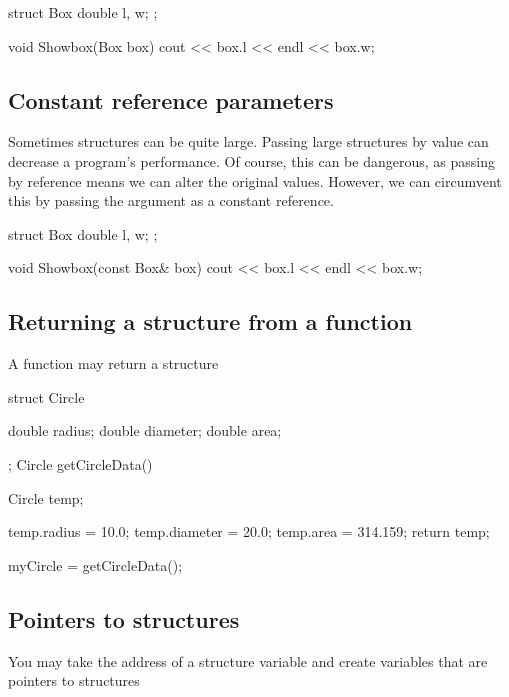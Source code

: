 \documentclass{report}
\begin{document}
	\begin{cppcode}
struct Box {
    double l, w;
};

void Showbox(Box box) {
    cout << box.l << endl << box.w;
}
	\end{cppcode}
	
	
	\bigbreak \noindent 
	\bigbreak \noindent 

	\pagebreak \bigbreak \noindent 
	\subsection{Constant reference parameters}
	\bigbreak \noindent 
	\begin{concept}
	   Sometimes structures can be quite large. Passing large structures by value can decrease a program's performance. Of course, this can be dangerous, as passing by reference means we can alter the original values. However, we can circumvent this by passing the argument as a constant reference.
	\end{concept}
	\bigbreak \noindent 
	
	\begin{cppcode}
struct Box {
    double l, w;
};

void Showbox(const Box& box) {
    cout << box.l << endl << box.w;
}
	\end{cppcode}
	

	\bigbreak \noindent 
	\subsection{Returning a structure from a function}
	\bigbreak \noindent 
	\begin{concept}
	   A function may return a structure 
	\end{concept}
	\bigbreak \noindent 
	
	\begin{cppcode}
struct Circle {
    double radius;
    double diameter;
    double area;

};
Circle getCircleData() {
    Circle temp;

    temp.radius = 10.0;
    temp.diameter = 20.0;
    temp.area = 314.159;
    return temp;
}
myCircle = getCircleData();
	\end{cppcode}
	

	\pagebreak \bigbreak \noindent 
	\subsection{Pointers to structures}
	\bigbreak \noindent 
	\begin{concept}
	   You may take the address of a structure variable and create variables that are pointers to structures 
	\end{concept}
	\bigbreak \noindent 
	
\end{document}

